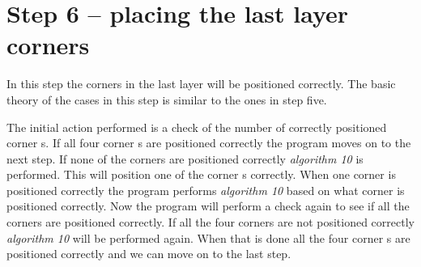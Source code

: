 \section{Step 6 -- placing the last layer corners}
In this step the corners in the last layer will be positioned correctly. 
The basic theory of the cases in this step is similar to the ones in step five.

The initial action performed is a check of the number of correctly positioned corner \cpiece{}s. 
If all four corner \cpiece{}s are positioned correctly the program moves on to the next step.
If none of the corners are positioned correctly \textit{algorithm 10} is performed. This will position one of the corner \cpiece{}s correctly.
When one corner is positioned correctly the program performs \textit{algorithm 10} based on what corner is positioned correctly.
Now the program will perform a check again to see if all the corners are positioned correctly. If all the four corners are not positioned correctly \textit{algorithm 10} will be performed again.
When that is done all the four corner \cpiece{}s are positioned correctly and we can move on to the last step.